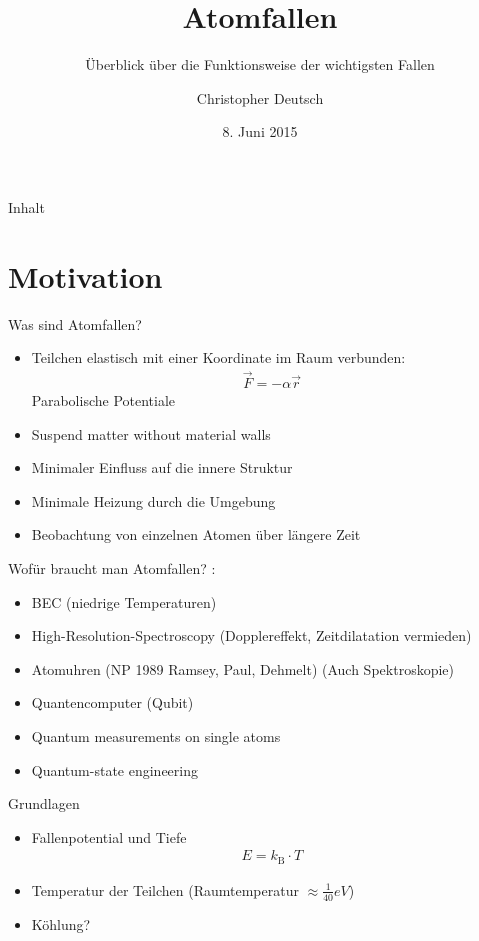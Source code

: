 \documentclass[12pt]{beamer}
\author[Christopher Deutsch]
{Christopher Deutsch}
\title
{Atomfallen}
\subtitle
{Überblick über die Funktionsweise der wichtigsten Fallen}
\institute[]
{Rheinische Friedrich-Wilhelms-Universität Bonn \\
Proseminar Präsentationstechnik SS15}
\date{8. Juni 2015}
\begin{document}
\maketitle

\begin{frame}{Inhalt}
	\tableofcontents
\end{frame}


\section{Motivation}

\begin{frame}{Was sind Atomfallen?}
	\begin{itemize}
		\item Teilchen elastisch mit einer Koordinate im Raum verbunden:
		\begin{align}
		\vec{F} = - \alpha \vec{r}
		\end{align}
		Parabolische Potentiale
		\item Suspend matter without material walls
		\item Minimaler Einfluss auf die innere Struktur
		\item Minimale Heizung durch die Umgebung
		\item Beobachtung von einzelnen Atomen über längere Zeit
	\end{itemize}
\end{frame}

\begin{frame}{Wofür braucht man Atomfallen?}
	\cite{wpw}:
	\begin{itemize}
		\item BEC (niedrige Temperaturen)
		\item High-Resolution-Spectroscopy (Dopplereffekt, Zeitdilatation vermieden)
		\item Atomuhren (NP 1989 Ramsey, Paul, Dehmelt) (Auch Spektroskopie)
		\item Quantencomputer (Qubit)
		\item Quantum measurements on single atoms
		\item Quantum-state engineering
	\end{itemize}
\end{frame}

\begin{frame}{Grundlagen}
	\begin{itemize}
		\item Fallenpotential und Tiefe
		\begin{align}
			E = k_\mathrm{B} \cdot T
		\end{align}
		\item Temperatur der Teilchen (Raumtemperatur $\approx \frac{1}{40} \si{eV}$)
		\item Köhlung?
		
	\end{itemize}
\end{frame}
\end{document}
